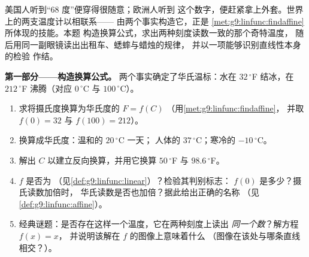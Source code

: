 \begin{problem}
\label{pb:g9:linfunc:1}
美国人听到“$68$ 度”便穿得很随意；欧洲人听到
这个数字，便赶紧拿上外套。世界上的两支温度计以相联系——
由两个事实构造它，正是
\cref{met:g9:linfunc:findaffine}所体现的技能。本题
构造换算公式，求出两种刻度读数一致的那个奇特温度，
随后用同一副眼镜读出出租车、蟋蟀与蜡烛的规律，
并以一项能够识别直线性本身的检验
作结。

\medskip
\noindent\textbf{第一部分——构造换算公式。}
两个事实确定了华氏温标：水在
$32\,^\circ$F 结冰，在 $212\,^\circ$F 沸腾（对应 $0\,^\circ$C 与
$100\,^\circ$C）。
\begin{enumerate}
  \item 求将摄氏度换算为华氏度的 $F = f(C)$
        （用\cref{met:g9:linfunc:findaffine}，
        并取 $f(0) = 32$ 与 $f(100) = 212$）。
  \item 换算成华氏度：温和的 $20\,^\circ$C 一天；
        人体的 $37\,^\circ$C；寒冷的 $-10\,^\circ$C。
  \item 解出 $C$ 以建立反向换算，并用它换算
        $50\,^\circ$F 与 $98.6\,^\circ$F。
  \item $f$ 是否为\emph{}
        （见\cref{def:g9:linfunc:linear}）？检验其判别标志：
        $f(0)$ 是多少？摄氏读数加倍时，
        华氏读数是否也加倍？据此给出正确的名称
        （见\cref{def:g9:linfunc:affine}）。
  \item 经典谜题：是否存在这样一个温度，它在两种刻度上读出
        \emph{同一个数}？解方程 $f(x) = x$，
        并说明该解在 $f$ 的图像上意味着什么
        （图像在该处与哪条直线相交？）。
\end{enumerate}


\end{problem}
